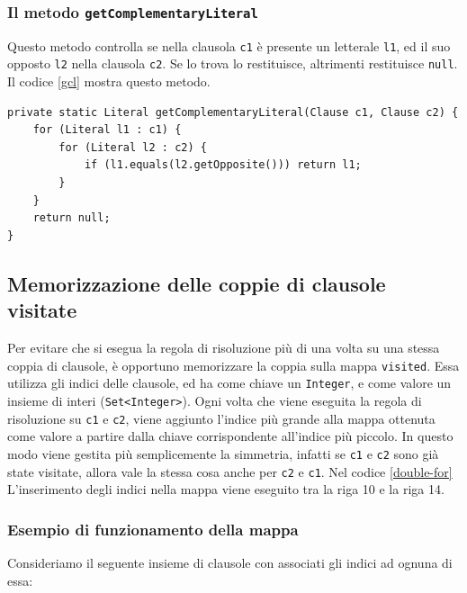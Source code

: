 \documentclass[a4paper,12pt]{report}
\begin{document}
\subsubsection{Il metodo \texttt{getComplementaryLiteral}}
\label{getComplementaryLiteral}
Questo metodo controlla se nella clausola \texttt{c1} è presente un letterale \texttt{l1}, ed il suo opposto \texttt{l2} nella clausola \texttt{c2}. Se lo trova lo restituisce, altrimenti restituisce \texttt{null}. Il codice \ref{gcl} mostra questo metodo. 

\begin{minipage}{\linewidth}
\small
\begin{lstlisting}[caption={Metodo \texttt{getComplementaryLiteral} della classe \texttt{Resolution}}, label={gcl}]
private static Literal getComplementaryLiteral(Clause c1, Clause c2) { 
    for (Literal l1 : c1) {
        for (Literal l2 : c2) { 
            if (l1.equals(l2.getOpposite())) return l1;
        }
    }
    return null;
}
\end{lstlisting}
\end{minipage}

\subsection{Memorizzazione delle coppie di clausole visitate}
\label{visited}
Per evitare che si esegua la regola di risoluzione più di una volta su una stessa coppia di clausole, è opportuno memorizzare la coppia sulla mappa \texttt{visited}. Essa utilizza gli indici delle clausole, ed ha come chiave un \texttt{Integer}, e come valore un insieme di interi (\texttt{Set<Integer>}). Ogni volta che viene eseguita la regola di risoluzione su \texttt{c1} e \texttt{c2}, viene aggiunto l'indice più grande alla mappa ottenuta come valore a partire dalla chiave corrispondente all'indice più piccolo. In questo modo viene gestita più semplicemente la simmetria, infatti se \texttt{c1} e \texttt{c2} sono già state visitate, allora vale la stessa cosa anche per \texttt{c2} e \texttt{c1}. Nel codice \ref{double-for} L'inserimento degli indici nella mappa viene eseguito tra la riga 10 e la riga 14.

\subsubsection{Esempio di funzionamento della mappa}
Consideriamo il seguente insieme di clausole con associati gli indici ad ognuna di essa:

\end{document}
